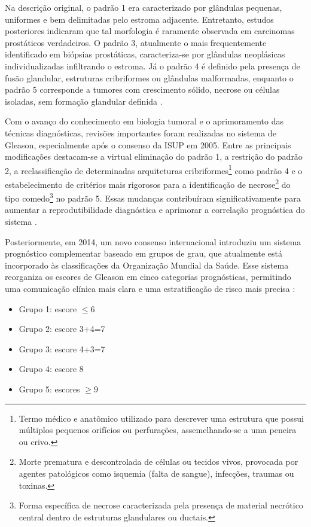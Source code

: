 Na descrição original, o padrão 1 era caracterizado por glândulas pequenas, uniformes e bem delimitadas pelo estroma adjacente. Entretanto, estudos posteriores indicaram que tal morfologia é raramente observada em carcinomas prostáticos verdadeiros. O padrão 3, atualmente o mais frequentemente identificado em biópsias prostáticas, caracteriza-se por glândulas neoplásicas individualizadas infiltrando o estroma. Já o padrão 4 é definido pela presença de fusão glandular, estruturas cribriformes ou glândulas malformadas, enquanto o padrão 5 corresponde a tumores com crescimento sólido, necrose ou células isoladas, sem formação glandular definida \cite{chen2016}.

Com o avanço do conhecimento em biologia tumoral e o aprimoramento das técnicas diagnósticas, revisões importantes foram realizadas no sistema de Gleason, especialmente após o consenso da ISUP em 2005. Entre as principais modificações destacam-se a virtual eliminação do padrão 1, a restrição do padrão 2, a reclassificação de determinadas arquiteturas cribriformes\footnote{Termo médico e anatômico utilizado para descrever uma estrutura que possui múltiplos pequenos orifícios ou perfurações, assemelhando-se a uma peneira ou crivo.}  como padrão 4 e o estabelecimento de critérios mais rigorosos para a identificação de necrose\footnote{Morte prematura e descontrolada de células ou tecidos vivos, provocada por agentes patológicos como isquemia (falta de sangue), infecções, traumas ou toxinas.}  do tipo comedo\footnote{Forma específica de necrose caracterizada pela presença de material necrótico central dentro de estruturas glandulares ou ductais.}  no padrão 5. Essas mudanças contribuíram significativamente para aumentar a reprodutibilidade diagnóstica e aprimorar a correlação prognóstica do sistema \cite{chen2016}.

Posteriormente, em 2014, um novo consenso internacional introduziu um sistema prognóstico complementar baseado em grupos de grau, que atualmente está incorporado às classificações da Organização Mundial da Saúde. Esse sistema reorganiza os escores de Gleason em cinco categorias prognósticas, permitindo uma comunicação clínica mais clara e uma estratificação de risco mais precisa \cite{ref-epstein2016}:

\begin{itemize}
	\item Grupo 1: escore $\leq 6$
	\item Grupo 2: escore 3+4=7
	\item Grupo 3: escore 4+3=7
	\item Grupo 4: escore 8
	\item Grupo 5: escores $\geq 9$
\end{itemize}

